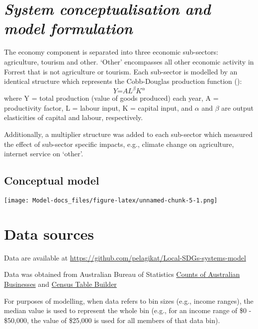 \documentclass[
  11pt,
]{book}
\begin{document}
\hypertarget{system-conceptualisation-and-model-formulation}{%
\section{\texorpdfstring{\emph{System conceptualisation and model formulation}}{System conceptualisation and model formulation}}\label{system-conceptualisation-and-model-formulation}}

The economy component is separated into three economic sub-sectors: agriculture, tourism and other. `Other' encompasses all other economic activity in Forrest that is not agriculture or tourism. Each sub-sector is modelled by an identical structure which represents the Cobb-Douglas production function (\citet{angulo_dynamics_2015}):
\[ Y \text{=} AL^{\beta} K^{\alpha} \]
where Y = total production (value of goods produced) each year, A = productivity factor, L = labour input, K = capital input, and \(\alpha\) and \(\beta\) are output elasticities of capital and labour, respectively.

Additionally, a multiplier structure was added to each sub-sector which measured the effect of sub-sector specific impacts, e.g., climate change on agriculture, internet service on `other'.

\hypertarget{conceptual-model-3}{%
\subsection{Conceptual model}\label{conceptual-model-3}}

\texttt{[image: Model-docs\_files/figure-latex/unnamed-chunk-5-1.png]}

\hypertarget{data-sources-3}{%
\section{Data sources}\label{data-sources-3}}

Data are available at \url{https://github.com/pelagikat/Local-SDGs-systems-model}

Data was obtained from Australian Bureau of Statistics
\href{https://www.abs.gov.au/statistics/economy/business-indicators/counts-australian-businesses-including-entries-and-exits/latest-release}{Counts of Australian Businesses}
and \href{https://www.abs.gov.au/websitedbs/censushome.nsf/home/tablebuilder}{Census Table Builder}

For purposes of modelling, when data refers to bin sizes (e.g., income ranges), the median value is used to represent the whole bin (e.g., for an income range of \$0 - \$50,000, the value of \$25,000 is used for all members of that data bin).
\end{document}
